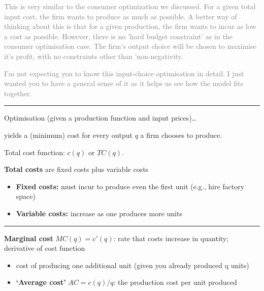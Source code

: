 \documentclass[]{article}
\providecommand{\tightlist}{%
  \setlength{\itemsep}{0pt}\setlength{\parskip}{0pt}}
\begin{document}
\bigskip

\textcolor{gray}{This is very similar to the consumer optimization we discussed. For a given total input cost, the firm wants to produce as much as possible. A better way of thinking about this is that for a given production, the firm wants to incur as low a cost as possible. However, there is no 'hard budget constraint' as in the consumer optimisation case. The firm's output choice will be chosen to maximise it's profit, with no constraints other than 'non-negativity. }

\textcolor{gray}{ I'm not expecting you to know this input-choice optimisation in detail. I just wanted you to have a general sense of it as it helps us see how the model fits together.}

\begin{center}\rule{0.5\linewidth}{\linethickness}\end{center}

Optimisation (given a production function and input prices)\ldots{}

yields a (minimum) cost for every output \(q\) a firm chooses to
produce.

\bigskip

Total cost function: \(c(q)\) or \(TC(q)\).

\textbf{Total costs} are fixed costs plus variable costs

\begin{itemize}
\item
  \textbf{Fixed costs:} must incur to produce even the first unit (e.g.,
  hire factory space)
\item
  \textbf{Variable costs:} increase as one produces more units
\end{itemize}

\begin{center}\rule{0.5\linewidth}{\linethickness}\end{center}

\textbf{Marginal cost} \(MC(q)=c'(q)\): rate that costs increase in
quantity; derivative of cost function

\begin{itemize}
\tightlist
\item
  cost of producing one additional unit (given you already produced q
  units)
\end{itemize}

\bigskip

\begin{itemize}
\tightlist
\item
  \textbf{`Average cost'} \(AC=c(q)/q\): the production cost per unit
  produced
\end{itemize}
\end{document}
